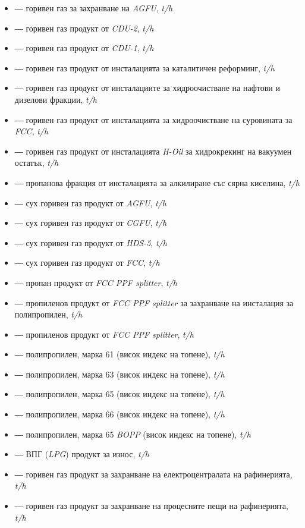 \begin{itemize}
	\item[$\beta$]  ― горивен газ за захранване на \textit{AGFU}, \textit{t/h}
	\item[$\beta_1$] ― горивен газ продукт от \textit{CDU-2}, \textit{t/h}
	\item[$\beta_2$] ― горивен газ продукт от \textit{CDU-1}, \textit{t/h}
	\item[$\beta_3$] ― горивен газ продукт от инсталацията за каталитичен реформинг, \textit{t/h}
	\item[$\beta_4$] ― горивен газ продукт от инсталациите за хидроочистване на нафтови и дизелови фракции, \textit{t/h}
	\item[$\beta_5$] ― горивен газ продукт от инсталацията за хидроочистване на суровината за \textit{FCC}, \textit{t/h}
	\item[$\beta_6$] ― горивен газ продукт от инсталацията \textit{H-Oil} за хидрокрекинг на вакуумен остатък, \textit{t/h}
	\item[$\beta_7$] ― пропанова фракция от инсталацията за алкилиране със сярна киселина, \textit{t/h}
	\item[$\beta_8$] ― сух горивен газ продукт от \textit{AGFU}, \textit{t/h}
	\item[$\beta_9$] ― сух горивен газ продукт от \textit{CGFU}, \textit{t/h}
	\item[$\beta_{10}$] ― сух горивен газ продукт от \textit{HDS-5}, \textit{t/h}
	\item[$\beta_{11}$] ― сух горивен газ продукт от \textit{FCC}, \textit{t/h}
	
	\item[$\gamma_1$] ― пропан продукт от \textit{FCC PPF splitter}, \textit{t/h}
	\item[$\gamma_2$] ― пропиленов продукт от \textit{FCC PPF splitter} за захранване на инсталация за полипропилен, \textit{t/h}
	\item[$\gamma_3$] ― пропиленов продукт от \textit{FCC PPF splitter}, \textit{t/h}
	
	\item[$\delta_1$] ― полипропилен, марка 61 (висок индекс на топене), \textit{t/h}
	\item[$\delta_2$] ― полипропилен, марка 63 (висок индекс на топене), \textit{t/h}
	\item[$\delta_3$] ― полипропилен, марка 65 (висок индекс на топене), \textit{t/h}
	\item[$\delta_4$] ― полипропилен, марка 66 (висок индекс на топене), \textit{t/h}
	\item[$\delta_5$] ― полипропилен, марка 65 \textit{BOPP} (висок индекс на топене), \textit{t/h}
	
	\item[$\epsilon_1$] ― ВПГ (\textit{LPG}) продукт за износ, \textit{t/h}
	\item[$\epsilon_2$] ― горивен газ продукт за захранване на електроцентралата на рафинерията, \textit{t/h}
	\item[$\epsilon_3$] ― горивен газ продукт за захранване на процесните пещи на рафинерията, \textit{t/h}
\end{itemize}

